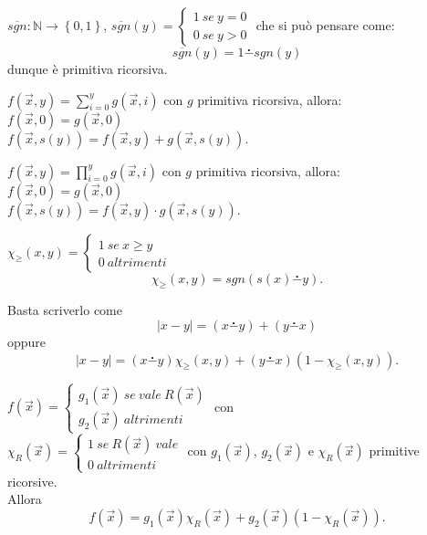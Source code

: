 %
%
\begin{esempio}[controsegno] $\overline{sgn}:\mathbb{N} \to
\left\{0,1\right\}$,
$ \overline{sgn}(y) = \left\{ \begin{array}{ll}
	1 \ se \ y = 0\\
	0 \ se \ y > 0
\end{array}\right.$ che si pu\`o pensare come:
 \[ \overline{sgn}(y) = 1 \stackrel{\centerdot}{-} sgn(y) \]
dunque \`e primitiva ricorsiva.
\end{esempio}
%
%
\begin{esempio}[] $f(\overrightarrow{x},y)= \sum_{i=0}^{y} g(\overrightarrow{x},
i)$ con $g$ primitiva ricorsiva, allora:\\
 $ f(\overrightarrow{x}, 0) = g(\overrightarrow{x}, 0)  $ \\
 $ f(\overrightarrow{x}, s(y)) = f(\overrightarrow{x}, y) +
g(\overrightarrow{x}, s(y)). $
\end{esempio}
%
%
\begin{esempio}[] $f(\overrightarrow{x},y)= \prod_{i=0}^{y}
g(\overrightarrow{x}, i)$ con $g$ primitiva ricorsiva, allora:\\
$	f(\overrightarrow{x}, 0) = g(\overrightarrow{x}, 0) $ \\
$ 	f(\overrightarrow{x}, s(y)) = f(\overrightarrow{x}, y) \cdot
g(\overrightarrow{x}, s(y)). $
\end{esempio}
%
%
\begin{esempio}[] $ \chi_{\geq}(x,y) = \left\{ \begin{array}{ll}
	1 \ se \ x \geq y\\
	0 \ altrimenti
\end{array}\right.$
\[ \chi_{\geq}(x,y) = sgn (s(x) \stackrel{\centerdot}{-} y) . \]
\end{esempio}
%
%
\begin{esempio} Basta scriverlo come
\[ \left|x - y \right| = (x \stackrel{\centerdot}{-} y) + ( y
\stackrel{\centerdot}{-} x) \]
oppure
\[ \left|x - y \right| = (x \stackrel{\centerdot}{-} y) \chi_{\geq}(x,y)  +
( y \stackrel{\centerdot}{-} x) (1 - \chi_{\geq}(x,y)) .\]
\end{esempio}
%
%
\begin{esempio}[] $f(\overrightarrow{x}) = \left\{ \begin{array}{ll}
	g_1(\overrightarrow{x})\ se\ vale\  R(\overrightarrow{x})\\
	g_2(\overrightarrow{x})\ altrimenti
\end{array}\right.$ con \\$\chi_R(\overrightarrow{x}) = \left\{
\begin{array}{ll}
	1\ se\ R(\overrightarrow{x})\ vale\\
	0\ altrimenti
\end{array}\right.$ con $g_1(\overrightarrow{x})$, $g_2(\overrightarrow{x})$
e $\chi_R(\overrightarrow{x})$ primitive ricorsive.\\
Allora
\[ f(\overrightarrow{x}) = g_1(\overrightarrow{x}) \chi_R(\overrightarrow{x}) +
 g_2(\overrightarrow{x}) (1 - \chi_R(\overrightarrow{x})). \]
\end{esempio}
%

